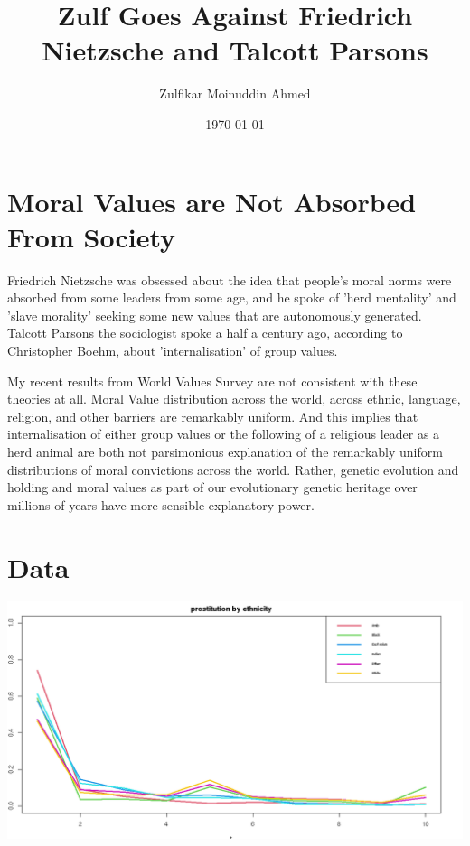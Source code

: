 \documentclass{amsart}
\title{Zulf Goes Against Friedrich Nietzsche and Talcott Parsons}
\author{Zulfikar Moinuddin Ahmed}
\date{\today}
\begin{document}
\maketitle

\section{Moral Values are Not Absorbed From Society}

Friedrich Nietzsche was obsessed about the idea that people's moral norms were absorbed from some leaders from some age, and he spoke of 'herd mentality' and 'slave morality' seeking some new values that are autonomously generated.  Talcott Parsons the sociologist spoke a half a century ago, according to Christopher Boehm, about 'internalisation' of group values.  

My recent results from World Values Survey are not consistent with these theories at all.  Moral Value distribution across the world, across ethnic, language, religion, and other barriers are remarkably uniform.  And this implies that internalisation of either group values or the following of a religious leader as a herd animal are both not parsimonious explanation of the remarkably uniform distributions of moral convictions across the world.  Rather, genetic evolution and holding and moral values as part of our evolutionary genetic heritage over millions of years have more sensible explanatory power.  

\section{Data}

\includegraphics[scale=0.4]{nietzsche_parsons_prost.png}
\end{document}
